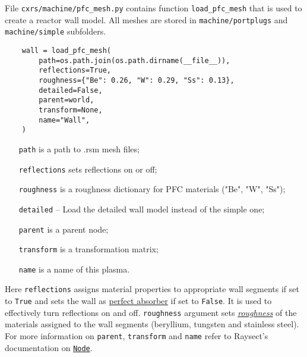 \documentclass[../../main]{subfiles}
\begin{document}
File \texttt{cxrs/machine/pfc\_mesh.py} contains function \texttt{load\_pfc\_mesh} that is used to create a reactor wall model. All meshes are stored in \texttt{machine/portplugs} and \texttt{machine/simple} subfolders.

\begin{verbatim}
    wall = load_pfc_mesh(
        path=os.path.join(os.path.dirname(__file__)),
        reflections=True,
        roughness={"Be": 0.26, "W": 0.29, "Ss": 0.13},
        detailed=False,
        parent=world,
        transform=None,
        name="Wall",
    )
\end{verbatim}

\begin{itemize}[align=left]
    \item[\texttt{path}] is a path to .rsm mesh files;
    \item[\texttt{reflections}] sets reflections on or off;
    \item[\texttt{roughness}] is a roughness dictionary for PFC materials ("Be", "W", "Ss");
    \item[\texttt{detailed}] -- Load the detailed wall model instead of the simple one;
    \item[\texttt{parent}] is a parent node;
    \item[\texttt{transform}] is a transformation matrix;
    \item[\texttt{name}] is a name of this plasma.
\end{itemize}
Here \texttt{reflections} assigns material properties to appropriate wall segments if set to \texttt{True} and sets the wall as \href{https://raysect.github.io/documentation/api_reference/optical/optical_surfaces.html?highlight=absorber#raysect.optical.material.absorber.AbsorbingSurface}{perfect absorber} if set to \texttt{False}. It is used to effectively turn reflections on and off. \texttt{roughness} argument sets \href{https://raysect.github.io/documentation/demonstrations/materials/surface_roughness.html?highlight=rough}{\emph{roughness}} of the materials assigned to the wall segments (beryllium, tungsten and stainless steel).
For more information on \texttt{parent}, \texttt{transform} and \texttt{name} refer to Raysect's documentation on \href{https://raysect.github.io/documentation/api_reference/edge/raysect_edge_scenegraph.html?highlight=node#raysect.edge.scenegraph.node.Node}{\texttt{Node}}.
\end{document}
